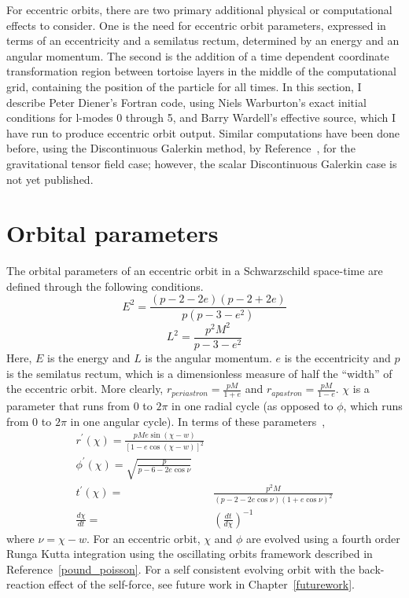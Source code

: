 For eccentric orbits, there are two primary additional physical or computational effects to consider. One is the need for eccentric orbit parameters, expressed in terms of an eccentricity and a semilatus rectum, determined by an energy and an angular momentum. The second is the addition of a time dependent coordinate transformation region between tortoise layers in the middle of the computational grid, containing the position of the particle for all times. In this section, I describe Peter Diener's Fortran code, using Niels Warburton's exact initial conditions for l-modes 0 through 5, and Barry Wardell's effective source, which I have run to produce eccentric orbit output. Similar computations have been done before, using the Discontinuous Galerkin method, by Reference~\cite{time_dependent_coordinate_transformation}, for the gravitational tensor field case; however, the scalar Discontinuous Galerkin case is not yet published.

\section{Orbital parameters}

The orbital parameters of an eccentric orbit in a Schwarzschild space-time are defined through the following conditions.
\begin{equation}
  E^2=\frac{(p-2-2e)(p-2+2e)}{p(p-3-e^2)}
\end{equation}
\begin{equation}
  L^2=\frac{p^2M^2}{p-3-e^2}
\end{equation}
Here, $E$ is the energy and $L$ is the angular momentum. $e$ is the eccentricity and $p$ is the semilatus rectum, which is a dimensionless measure of half the ``width'' of the eccentric orbit. More clearly, $r_{periastron}=\frac{pM}{1+e}$ and $r_{apastron}=\frac{pM}{1-e}$. $\chi$ is a parameter that runs from $0$ to $2\pi$ in one radial cycle (as opposed to $\phi$, which runs from $0$ to $2\pi$ in one angular cycle). In terms of these parameters~\cite{pound_poisson},
\begin{eqnarray}
  r^\prime(\chi)=\frac{pMe\sin(\chi-w)}{[1-e\cos(\chi-w)]^2}\\
  \phi^\prime(\chi)=\sqrt{\frac{p}{p-6-2e\cos\nu}}\\
  t^\prime(\chi)=&\frac{p^2M}{(p-2-2e\cos\nu)(1+e\cos\nu)^2}\nonumber\\
  \frac{d\chi}{dt}=&(\frac{dt}{d\chi})^{-1}
\end{eqnarray}
where $\nu=\chi-w$. For an eccentric orbit, $\chi$ and $\phi$ are evolved using a fourth order Runga Kutta integration using the oscillating orbits framework described in Reference~\ref{pound_poisson}. For a self consistent evolving orbit with the back-reaction effect of the self-force, see future work in Chapter~\ref{futurework}. 


